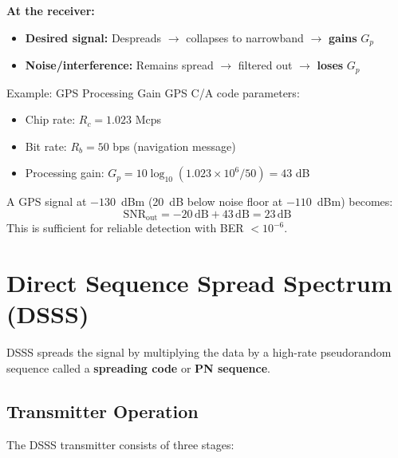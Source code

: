 \textbf{At the receiver:}
\begin{itemize}
\item \textbf{Desired signal:} Despreads $\rightarrow$ collapses to narrowband $\rightarrow$ \textbf{gains} $G_p$
\item \textbf{Noise/interference:} Remains spread $\rightarrow$ filtered out $\rightarrow$ \textbf{loses} $G_p$
\end{itemize}

\begin{calloutbox}{Example: GPS Processing Gain}
GPS C/A code parameters:
\begin{itemize}
\item Chip rate: $R_c = 1.023$ Mcps
\item Bit rate: $R_b = 50$ bps (navigation message)
\item Processing gain: $G_p = 10\log_{10}(1.023 \times 10^6 / 50) = 43$ dB
\end{itemize}

A GPS signal at $-130$~dBm (20~dB below noise floor at $-110$~dBm) becomes:
$$\mathrm{SNR}_{\mathrm{out}} = -20\,\mathrm{dB} + 43\,\mathrm{dB} = 23\,\mathrm{dB}$$
This is sufficient for reliable detection with BER $< 10^{-6}$.
\end{calloutbox}

\section{Direct Sequence Spread Spectrum (DSSS)}

DSSS spreads the signal by multiplying the data by a high-rate pseudorandom sequence called a \textbf{spreading code} or \textbf{PN sequence}.

\subsection{Transmitter Operation}

The DSSS transmitter consists of three stages:

